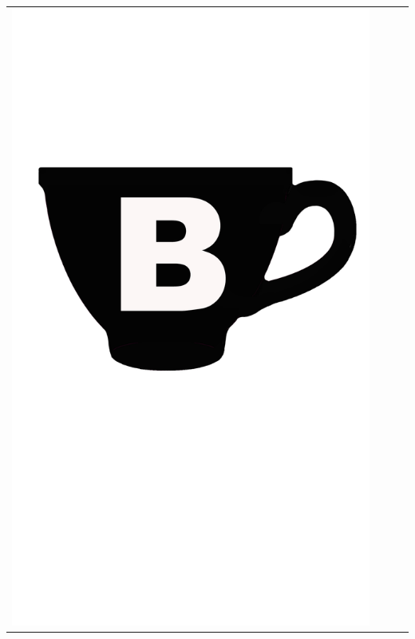 {\renewcommand{\arraystretch}{1.1}
\begin{center}
\begin{tabular}{ c c c c}
\includegraphics[scale=0.021, trim= 0em 15em -5em -5em,]{Icones/icon_cidreB_black.pdf}
&

\end{tabular}
\end{center}}
